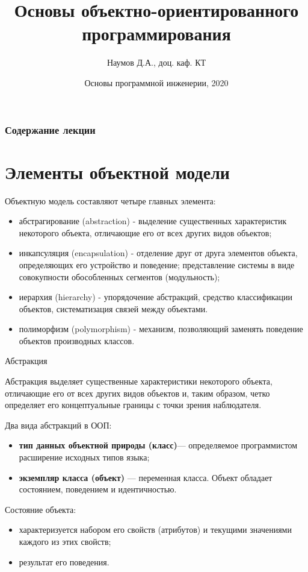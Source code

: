 \documentclass{beamer}
\title[Software Design]{Основы объектно-ориентированного программирования}
\author{Наумов Д.А., доц. каф. КТ}
\date[05.10.2019] {Основы программной инженерии, 2020}
\begin{document}
\begin{frame}
  \titlepage
\end{frame}
  
\begin{frame}
  \frametitle{Содержание лекции}
  \tableofcontents  
\end{frame}
  
\section{Элементы объектной модели}
\begin{frame}
Объектную модель составляют четыре главных элемента:
\begin{itemize}
\item абстрагирование (abstraction) - выделение существенных характеристик некоторого объекта, отличающие его от всех других видов объектов;
\item инкапсуляция (encapsulation) - отделение друг от друга элементов объекта, определяющих его устройство и поведение; представление системы в виде совокупности обособленных сегментов (модульность);
\item иерархия (hierarchy) - упорядочение абстракций, средство классификации объектов, систематизация связей между объектами.
\item полиморфизм (polymorphism) - механизм, позволяющий заменять поведение объектов производных классов.
\end{itemize}
\end{frame}

\begin{frame}{Абстракция}
\begin{block}{Абстракция}
выделяет существенные характеристики некоторого объекта, отличающие его от всех других видов объектов и, таким образом, четко определяет его концептуальные границы с точки зрения наблюдателя.
\end{block}
Два вида абстракций в ООП:
\begin{itemize}
\item \textbf{тип данных объектной природы (класс)}— определяемое программистом
расширение исходных типов языка;
\item \textbf{экземпляр класса (объект)} — переменная класса. Объект обладает состоянием, поведением и идентичностью.
\end{itemize}
Состояние объекта:
\begin{itemize}
\item характеризуется набором его свойств (атрибутов) и текущими значениями каждого из этих свойств;
\item результат его поведения.
\end{itemize}
\end{frame}
\end{document}
